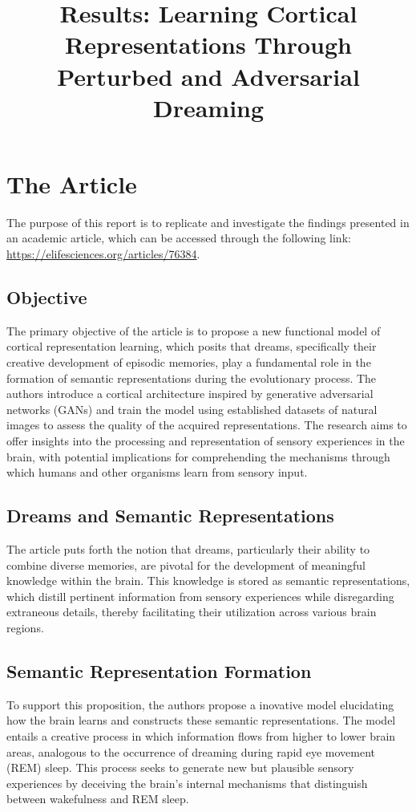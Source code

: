\documentclass{midl} %
\title[Results: Learning Cortical Representations Through Perturbed and Adversarial Dreaming]{Results: Learning Cortical Representations Through Perturbed and Adversarial Dreaming}
\begin{document}
\maketitle


\section{The Article}
The purpose of this report is to replicate and investigate the findings presented in an academic article, which can be accessed through the following link: \url{https://elifesciences.org/articles/76384}.

\subsection{Objective}
The primary objective of the article is to propose a new functional model of cortical representation learning, which posits that dreams, specifically their creative development of episodic memories, play a fundamental role in the formation of semantic representations during the evolutionary process. The authors introduce a cortical architecture inspired by generative adversarial networks (GANs) and train the model using established datasets of natural images to assess the quality of the acquired representations. The research aims to offer insights into the processing and representation of sensory experiences in the brain, with potential implications for comprehending the mechanisms through which humans and other organisms learn from sensory input.

\subsection{Dreams and Semantic Representations}
The article puts forth the notion that dreams, particularly their ability to combine diverse memories, are pivotal for the development of meaningful knowledge within the brain. This knowledge is stored as semantic representations, which distill pertinent information from sensory experiences while disregarding extraneous details, thereby facilitating their utilization across various brain regions.

\subsection{Semantic Representation Formation}
To support this proposition, the authors propose a inovative model elucidating how the brain learns and constructs these semantic representations. The model entails a creative process in which information flows from higher to lower brain areas, analogous to the occurrence of dreaming during rapid eye movement (REM) sleep. This process seeks to generate new but plausible sensory experiences by deceiving the brain's internal mechanisms that distinguish between wakefulness and REM sleep.
\end{document}
